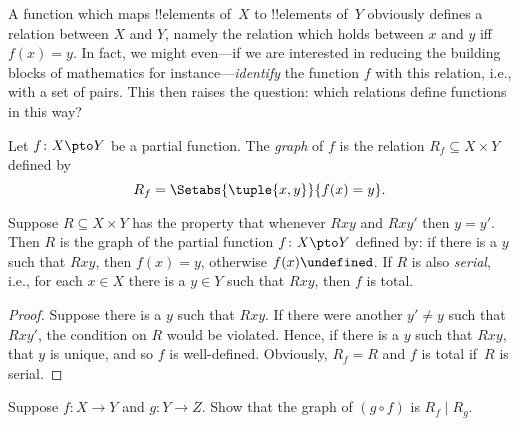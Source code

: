\documentclass[../../../include/open-logic-section]{subfiles}
\begin{document}


\begin{explain}
A function which maps !!{element}s of~$X$ to !!{element}s of~$Y$
obviously defines a relation between $X$ and $Y$, namely the relation
which holds between $x$ and $y$ iff $f(x) = y$.  In fact, we might
even---if we are interested in reducing the building blocks of
mathematics for instance---\emph{identify} the function $f$ with this
relation, i.e., with a set of pairs.  This then raises the question:
which relations define functions in this way?
\end{explain}

\begin{defn}[Graph]
Let $f\colon X \pto Y$ be a partial function. The \emph{graph} of $f$
is the relation $R_f \subseteq X \times Y$ defined by
\[
R_f = \Setabs{\tuple{x,y}}{f(x) = y}.
\]
\end{defn}

\begin{prop}
Suppose $R \subseteq X \times Y$ has the property that whenever $Rxy$
and $Rxy'$ then $y = y'$.  Then $R$ is the graph of the partial
function $f\colon X \pto Y$ defined by: if there is a $y$ such that
$Rxy$, then $f(x) = y$, otherwise $f(x) \undefined$.  If $R$ is also 
\emph{serial}, i.e., for each $x \in X$ there is a $y \in Y$ such that
$Rxy$, then $f$ is total.
\end{prop}

\begin{proof}
Suppose there is a $y$ such that $Rxy$.  If there were another $y'
\neq y$ such that $Rxy'$, the condition on $R$ would be
violated. Hence, if there is a $y$ such that $Rxy$, that $y$ is
unique, and so $f$ is well-defined.  Obviously, $R_f = R$ and $f$ is
total if~$R$ is serial.
\end{proof}

\begin{prob}
Suppose $f \colon X \to Y$ and $g \colon Y \to Z$. Show that the graph
of $(g \circ f)$ is $R_f \mid R_g$.
\end{prob}
\end{document}
